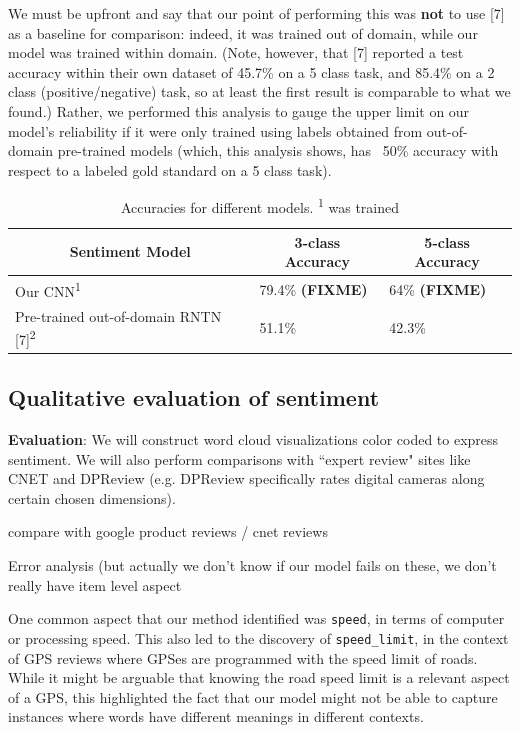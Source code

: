 \documentclass{article} %
\begin{document}
We must be upfront and say that our point of performing this was \textbf{not} to use [7] as a baseline for comparison: indeed, it was trained out of domain, while our model was trained within domain. (Note, however, that [7] reported a test accuracy within their own dataset of 45.7\% on a 5 class task, and 85.4\% on a 2 class (positive/negative) task, so at least the first result is comparable to what we found.) Rather, we performed this analysis to gauge the upper limit on our model's reliability if it were only trained using labels obtained from out-of-domain pre-trained models (which, this analysis shows, has ~50\% accuracy with respect to a labeled gold standard on a 5 class task).

\begin{table}[t]
\begin{center}
\begin{tabular}{lll}
\multicolumn{1}{c}{\bf Sentiment Model}  &\multicolumn{1}{c}{\bf 3-class Accuracy} &\multicolumn{1}{c}{\bf 5-class Accuracy} \\ \hline
 Our CNN\textsuperscript{1} & 79.4\% \textbf{(FIXME)} & 64\% \textbf{(FIXME)} \\
 Pre-trained out-of-domain RNTN [7]\textsuperscript{2}       & 51.1\% & 42.3\% \\
\end{tabular}
\end{center}
\caption{Accuracies for different models. \textsuperscript{1} was trained }
\label{ModelResultsTable}
\end{table}



\subsection{Qualitative evaluation of sentiment}

\textbf{Evaluation}: We will construct word cloud visualizations color coded to express sentiment. We will also perform comparisons with ``expert review" sites like CNET and DPReview (e.g. DPReview specifically rates digital cameras along certain chosen dimensions).


compare with google product reviews / cnet reviews

Error analysis (but actually we don't know if our model fails on these, we don't really have item level aspect

One common aspect that our method identified was \texttt{speed}, in terms of computer or processing speed. This also led to the discovery of \texttt{speed\_limit}, in the context of GPS reviews where GPSes are programmed with the speed limit of roads. While it might be arguable that knowing the road speed limit is a relevant aspect of a GPS, this highlighted the fact that our model might not be able to capture instances where words have different meanings in different contexts.
\end{document}
